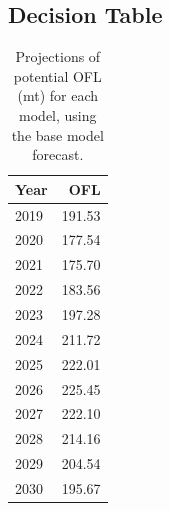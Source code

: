 \documentclass[12pt,]{article}
\begin{document}
\FloatBarrier

\subsection*{Decision Table}\label{decision-table}

\begin{table}[ht]
\centering
\caption{Projections of potential OFL (mt) for 
                                        each model, using the base model forecast.} 
\label{tab:OFL_projection}
\begin{tabular}{lr}
  \hline
Year & OFL \\ 
  \hline
2019 & 191.53 \\ 
  2020 & 177.54 \\ 
  2021 & 175.70 \\ 
  2022 & 183.56 \\ 
  2023 & 197.28 \\ 
  2024 & 211.72 \\ 
  2025 & 222.01 \\ 
  2026 & 225.45 \\ 
  2027 & 222.10 \\ 
  2028 & 214.16 \\ 
  2029 & 204.54 \\ 
  2030 & 195.67 \\ 
   \hline
\end{tabular}
\end{table}\begin{table}[ht]
\centering
\caption{Summary of 10-year 
                                             projections beginning in 2020 
                                             for alternate states of nature based on 
                                             an axis of uncertainty for the model.  Columns range over low, mid, and high
                                             states of nature, and rows range over different 
                                             assumptions of catch levels. An entry of "--" 
                                             indicates that the stock is driven to very low 
                                             abundance under the particular scenario.} 
\label{tab:Decision_table_mod1}
\end{table}
\end{document}
